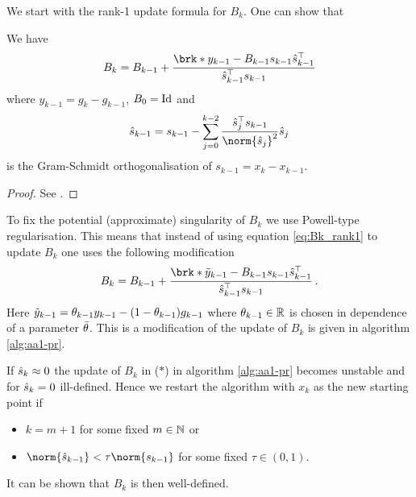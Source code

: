 	
We start with the rank-1 update formula for $B_k$. One can show that
\begin{proposition}
	We have
	\begin{align}
		B_{k} = B_{k-1}+\frac{\brk*{y_{k-1}-B_{k-1}s_{k-1}}\hs_{k-1}^\top}{\hs_{k-1}^\top s_{k-1}}\label{eq:Bk_rank1}
	\end{align}
	where $y_{k-1} = g_{k}-g_{k-1}$, $B_0=\operatorname{Id}$ and
	\begin{align*}
		\hs_{k-1} = s_{k-1}-\sum_{j=0}^{k-2}\frac{\hs_j^\top s_{k-1}}{\norm{\hs_j}^2}\hs_j
	\end{align*}
	is the Gram-Schmidt orthogonalisation of $s_{k-1}=x_{k}-x_{k-1}$.
\end{proposition}
\begin{proof}
	See \cite{ZhaAA}.
\end{proof}
To fix the potential (approximate) singularity of $B_k$ we use Powell-type regularisation. This means that instead of using equation \ref{eq:Bk_rank1} to update $B_k$ one uses the following modification
\begin{align*}
		B_{k} = B_{k-1}+\frac{\brk*{\tiy_{k-1}-B_{k-1}s_{k-1}}\hs_{k-1}^\top}{\hs_{k-1}^\top s_{k-1}}\,.
\end{align*}
Here $\tilde{y}_{k-1}=\theta_{k-1}y_{k-1}-(1-\theta_{k-1})g_{k-1}$ where $\theta_{k-1}\in\mathbb{R}$ is chosen in dependence of a parameter $\bar{\theta}$.
This is a modification of the update of $B_k$ is given in algorithm \ref{alg:aa1-pr}.

If $\hat{s}_k\approx 0$ the update of $B_k$ in ($*$) in algorithm \ref{alg:aa1-pr} becomes unstable and for $\hat{s}_k=0$ ill-defined.
Hence we restart the algorithm with $x_k$ as the new starting point if
\begin{itemize}
	\item $k=m+1$ for some fixed $m\in\mathbb{N}$ or
	\item $\norm{\hs_{k-1}}<\tau\norm{s_{k-1}}$ for some fixed $\tau\in(0,1)$.
\end{itemize}
It can be shown that $B_k$ is then well-defined.

